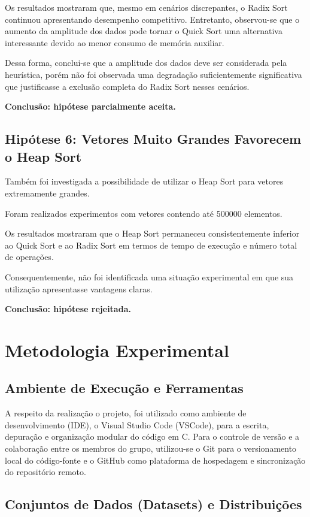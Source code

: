 \documentclass{article}
\begin{document}
Os resultados mostraram que, mesmo em cenários discrepantes, o Radix Sort continuou apresentando desempenho competitivo. Entretanto, observou-se que o aumento da amplitude dos dados pode tornar o Quick Sort uma alternativa interessante devido ao menor consumo de memória auxiliar.

Dessa forma, conclui-se que a amplitude dos dados deve ser considerada pela heurística, porém não foi observada uma degradação suficientemente significativa que justificasse a exclusão completa do Radix Sort nesses cenários.

\textbf{Conclusão: hipótese parcialmente aceita.}

\subsection{Hipótese 6: Vetores Muito Grandes Favorecem o Heap Sort}

Também foi investigada a possibilidade de utilizar o Heap Sort para vetores extremamente grandes.

Foram realizados experimentos com vetores contendo até 500000 elementos.

Os resultados mostraram que o Heap Sort permaneceu consistentemente inferior ao Quick Sort e ao Radix Sort em termos de tempo de execução e número total de operações.

Consequentemente, não foi identificada uma situação experimental em que sua utilização apresentasse vantagens claras.

\textbf{Conclusão: hipótese rejeitada.}


\section{Metodologia Experimental}

\subsection{Ambiente de Execução e Ferramentas}
A respeito da realização o projeto, foi utilizado como ambiente de desenvolvimento (IDE), o Visual Studio Code (VSCode), para a escrita, depuração e organização modular do código em C.
Para o controle de versão e a colaboração entre os membros do grupo, utilizou-se o Git para o versionamento local do código-fonte e o GitHub como plataforma de hospedagem e sincronização do repositório remoto.

\subsection{Conjuntos de Dados (Datasets) e Distribuições}
\end{document}
